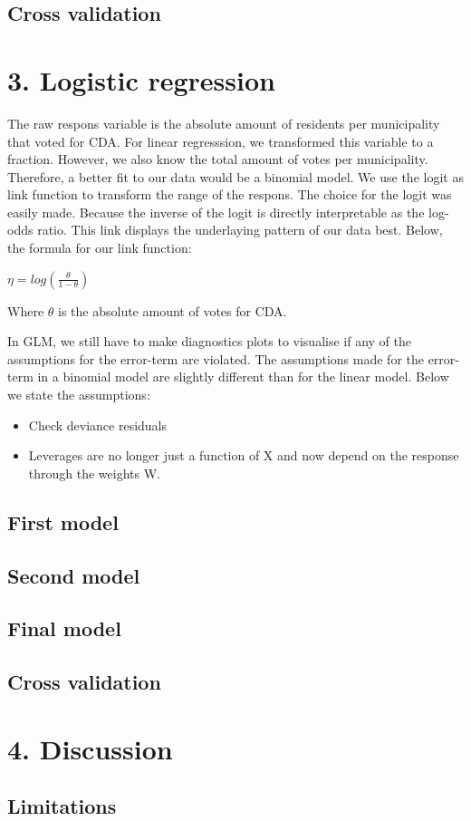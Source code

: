 \documentclass[11pt,]{article}
\begin{document}
\subsection{Cross validation}\label{cross-validation}

\section{3. Logistic regression}\label{logistic-regression}

The raw respons variable is the absolute amount of residents per
municipality that voted for CDA. For linear regresssion, we transformed
this variable to a fraction. However, we also know the total amount of
votes per municipality. Therefore, a better fit to our data would be a
binomial model. We use the logit as link function to transform the range
of the respons. The choice for the logit was easily made. Because the
inverse of the logit is directly interpretable as the log-odds ratio.
This link displays the underlaying pattern of our data best. Below, the
formula for our link function:

\(\eta = log(\frac{\theta}{1 - \theta})\)

Where \(\theta\) is the absolute amount of votes for CDA.

In GLM, we still have to make diagnostics plots to visualise if any of
the assumptions for the error-term are violated. The assumptions made
for the error-term in a binomial model are slightly different than for
the linear model. Below we state the assumptions:

\begin{itemize}
\item[] Check deviance residuals
\item[] Leverages are no longer just a function of X and now depend on the response through the weights W.
\end{itemize}

\subsection{First model}\label{first-model-1}

\subsection{Second model}\label{second-model}

\subsection{Final model}\label{final-model-1}

\subsection{Cross validation}\label{cross-validation-1}

\section{4. Discussion}\label{discussion}

\subsection{Limitations}\label{limitations}
\end{document}
